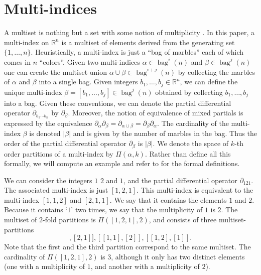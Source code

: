 \documentclass[12pt]{amsart}
\newcommand{\R}{\ensuremath{\mathbb{R}}}
\DeclareMathOperator{\bag}{bag}
\begin{document}
\section{Multi-indices}
\label{sec:multi}
A multiset is nothing but a set with some notion of multiplicity \cite{Blizard1989}.
In this paper, a multi-index on $\R^n$ is a multiset of elements derived from the generating set $\{1,\dots,n\}$.
Heuristically, a multi-index is just a ``bag of marbles'' each of which comes in $n$ ``colors''.
Given two multi-indices $\alpha \in \bag^i(n)$ and $\beta \in \bag^j(n)$ one can create the
multiset union $\alpha \cup \beta \in \bag^{i+j}(n)$ by collecting the marbles of $\alpha$ and $\beta$ into a single bag.
Given integers $b_1,\dots,b_j \in \R^n$, we can define the unique multi-index $\beta = [b_1,\dots,b_j] \in \bag^j(n)$
obtained by collecting $b_1,\dots,b_j$ into a bag.
Given these conventions, we can denote the partial differential operator $\partial_{b_1 \cdots b_n }$ by $\partial_\beta$.
Moreover, the notion of equivalence of mixed partials is expressed by the equivalence 
$\partial_\alpha \partial_\beta = \partial_{\alpha \cup \beta} = \partial_\beta \partial_\alpha$.
The cardinality of the multi-index $\beta$ is denoted $|\beta|$ and is given by the number of marbles in the bag.
Thus the order of the partial differential operator $\partial_{\beta}$ is $|\beta|$.
We denote the space of $k$-th order partitions of a multi-index by $\Pi(\alpha,k)$.
Rather than define all this formally, we will compute an example and refer to \cite{Jacobs2014b} for the formal definitions.

We can consider the integers $1$ $2$ and $1$, and the partial differential operator $\partial_{121}$.
The associated multi-index is just $[1,2,1]$.  This multi-index is equivalent to the multi-index $[1,1,2]$ and $[2,1,1]$.
We say that it contains the elements $1$ and $2$.
Because it contains `$1$' two times, we say that the multiplicity of $1$ is $2$.
The multiset of $2$-fold partitions is $\Pi( [1,2,1],2)$, and consists of three multiset-partitions
\begin{equation*}
	[ [1] , [2,1] ] , [[1,1] , [2] ] , [ [1, 2] , [1] ].
\end{equation*}
Note that the first and the third partition correspond to the same multiset.
The cardinality of $\Pi( [1,2,1],2)$ is $3$, although it only has two distinct elements (one with a multiplicity of $1$, and another with a multiplicity of $2$).
\end{document}
